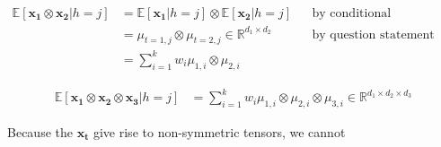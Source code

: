 \documentclass[11pt]{amsart}
\newcommand{\vek}[1]{\mathbf{#1}}
\begin{document}
\begin{equation}
\begin{aligned}
\mathbb{E}[\vek{x_1} \otimes \vek{x_2} \vert h=j] &= \mathbb{E}[\vek{x_1} \vert h=j] \otimes \mathbb{E}[\vek{x_2} \vert h=j] && \text{by conditional independence} \\
								           &= \mu_{t=1, j} \otimes \mu_{t=2, j}  \in \mathbb{R}^{d_1 \times d_2}&& \text{by question statement}\\
								           &= \sum_{i=1}^k w_i \mu_{1,i} \otimes \mu_{2, i}
\end{aligned}
\end{equation}

\begin{equation}
\begin{aligned}
\mathbb{E}[\vek{x_1} \otimes \vek{x_2} \otimes \vek{x_3} \vert h=j] &= \sum_{i=1}^k w_i \mu_{1,i} \otimes \mu_{2, i} \otimes \mu_{3, i} \in \mathbb{R}^{d_1 \times d_2 \times d_3}
\end{aligned}
\end{equation}

Because the $\vek{x_t}$ give rise to non-symmetric tensors, we cannot 
\end{document}
